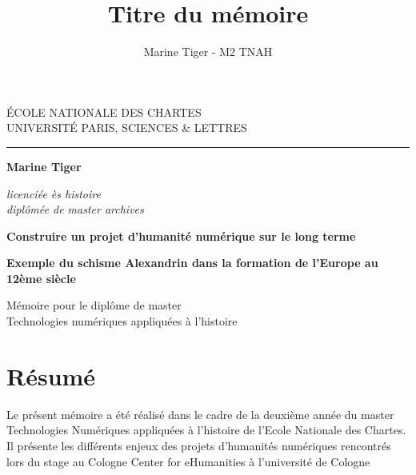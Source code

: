 \documentclass[a4paper,12pt,twoside]{book}
\author{Marine Tiger - M2 TNAH}
\title{Titre du mémoire}
\begin{document}
	\begin{titlepage}
		\begin{center}
			
			\bigskip
			
			\begin{large}				
				ÉCOLE NATIONALE DES CHARTES\\
				UNIVERSITÉ PARIS, SCIENCES \& LETTRES
			\end{large}
			\begin{center}\rule{2cm}{0.02cm}\end{center}
			
			\bigskip
			\bigskip
			\bigskip
			\begin{Large}
				\textbf{Marine Tiger}\\
			\end{Large}
			\begin{normalsize} \textit{licenciée ès histoire}\\
				\textit{diplômée de master archives}
			\end{normalsize}
			
			\bigskip
			\bigskip
			\bigskip
			
			\begin{Huge}
				\textbf{Construire un projet d'humanité numérique sur le long terme}\\
			\end{Huge}
			\bigskip
			\bigskip
			\begin{LARGE}
				\textbf{Exemple du schisme Alexandrin dans la formation de l’Europe au 12ème siècle}\\
			\end{LARGE}
			
			\bigskip
			\bigskip
			\bigskip
			\begin{large}
			\end{large}
			\vfill
			
			\begin{large}
				Mémoire 
				pour le diplôme de master \\
				\og{} Technologies numériques appliquées à l'histoire \fg{} \\
			\end{large}
			
		\end{center}
	\end{titlepage}
	
	\thispagestyle{empty}	
	\cleardoublepage
	
	\frontmatter
	\chapter{Résumé}
	\medskip
	Le présent mémoire a été réalisé dans le cadre de la deuxième année du master Technologies Numériques appliquées à l'histoire de l'Ecole Nationale des Chartes. Il présente les différents enjeux des projets d'humanités numériques rencontrés lors du stage au Cologne Center for eHumanities à l'université de Cologne\\
	
\end{document}
